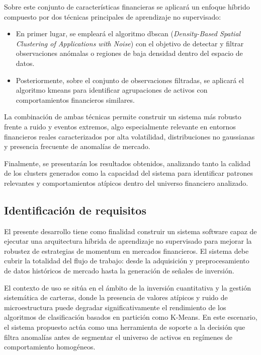 \documentclass[
]{article}
\begin{document}
Sobre este conjunto de características financieras se aplicará un enfoque híbrido compuesto por dos técnicas principales de aprendizaje no supervisado:

\begin{itemize}
\item En primer lugar, se empleará el algoritmo \gls{dbscan} (\textit{Density-Based Spatial Clustering of Applications with Noise}) con el objetivo de detectar y filtrar observaciones anómalas o regiones de baja densidad dentro del espacio de datos.
    
\item Posteriormente, sobre el conjunto de observaciones filtradas, se aplicará el algoritmo \gls{kmeans} para identificar agrupaciones de activos con comportamientos financieros similares.
\end{itemize}

La combinación de ambas técnicas permite construir un sistema más robusto frente a ruido y eventos extremos, algo especialmente relevante en entornos financieros reales caracterizados por alta volatilidad, distribuciones no gaussianas y presencia frecuente de anomalías de mercado.

Finalmente, se presentarán los resultados obtenidos, analizando tanto la calidad de los clusters generados como la capacidad del sistema para identificar patrones relevantes y comportamientos atípicos dentro del universo financiero analizado.

\subsection{Identificación de requisitos}

El presente desarrollo tiene como finalidad construir un sistema 
software capaz de ejecutar una arquitectura híbrida de aprendizaje 
no supervisado para mejorar la robustez de estrategias de momentum 
en mercados financieros. El sistema debe cubrir la totalidad del 
flujo de trabajo: desde la adquisición y preprocesamiento de datos 
históricos de mercado hasta la generación de señales de inversión.

El contexto de uso se sitúa en el ámbito de la inversión cuantitativa 
y la gestión sistemática de carteras, donde la presencia de valores 
atípicos y ruido de microestructura puede degradar significativamente 
el rendimiento de los algoritmos de clasificación basados en partición 
como K-Means. En este escenario, el sistema propuesto actúa como una 
herramienta de soporte a la decisión que filtra anomalías antes de 
segmentar el universo de activos en regímenes de comportamiento 
homogéneos.
\end{document}
